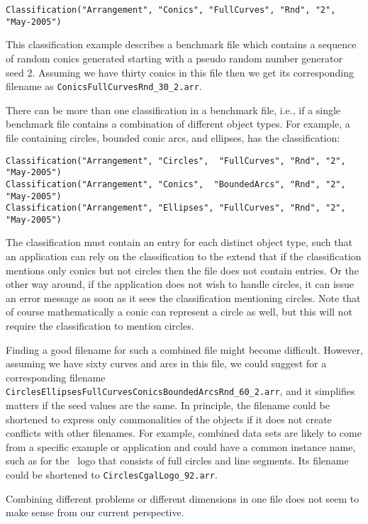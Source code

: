 \begin{verbatim}
Classification("Arrangement", "Conics", "FullCurves", "Rnd", "2", "May-2005")
\end{verbatim}

\noindent
This classification example describes a benchmark file which contains
a sequence of random conics generated starting with a pseudo random
number generator seed 2. Assuming we have thirty conics in this file
then we get its corresponding filename as
\texttt{ConicsFullCurvesRnd\_30\_2.arr}. 
  
There can be more than one classification in a benchmark file, i.e., if
a single benchmark file contains a combination of different object types.
For example, a file containing circles, bounded conic arcs, and
ellipses, has the classification:

\begin{verbatim}
Classification("Arrangement", "Circles",  "FullCurves", "Rnd", "2", "May-2005")
Classification("Arrangement", "Conics",  "BoundedArcs", "Rnd", "2", "May-2005")
Classification("Arrangement", "Ellipses", "FullCurves", "Rnd", "2", "May-2005")
\end{verbatim}

\noindent
The classification must contain an entry for each distinct object
type, such that an application can rely on the classification to the
extend that if the classification mentions only conics but not
circles then the file does not contain  entries. Or
the other way around, if the application does not wish to handle
circles, it can issue an error message as soon as it sees the
classification mentioning circles. Note that of course mathematically
a conic can represent a circle as well, but this will not require the
classification to mention circles.

Finding a good filename for such a combined file might become difficult.
However, assuming we have sixty curves and arcs in this file, we could
suggest for a corresponding filename
\texttt{CirclesEllipsesFullCurvesConicsBoundedArcsRnd\_60\_2.arr}, and
it simplifies matters if the seed values are the same. In principle,
the filename could be shortened to express only commonalities of the
objects if it does not create conflicts with other filenames. For
example, combined data sets are likely to come from a specific example
or application and could have a common instance name, such as
 for the \cgal\ logo that consists of full circles and
line segments. Its filename could be shortened to
\texttt{CirclesCgalLogo\_92.arr}.

Combining different problems or different dimensions in one file does
not seem to make sense from our current perspective.

